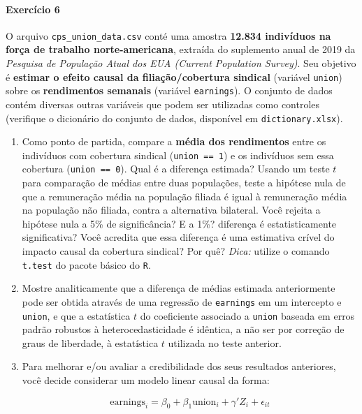 \documentclass[10pt,a4paper]{article}
\begin{document}
 \paragraph{Exercício 6} O arquivo \texttt{cps\_union\_data.csv} conté uma amostra \textbf{12.834 indivíduos na força de trabalho norte-americana}, extraída do suplemento anual de 2019 da \textit{Pesquisa de População Atual dos EUA (Current Population Survey)}. Seu objetivo é \textbf{estimar o efeito causal da filiação/cobertura sindical} (variável \texttt{union}) sobre os \textbf{rendimentos semanais} (variável \texttt{earnings}). O conjunto de dados contém diversas outras variáveis que podem ser utilizadas como controles (verifique o dicionário do conjunto de dados, disponível em \texttt{dictionary.xlsx}).
 
 \begin{enumerate}[label=\roman*]
 	
 	\item Como ponto de partida, compare a \textbf{média dos rendimentos} entre os indivíduos com cobertura sindical (\texttt{union == 1}) e os indivíduos sem essa cobertura (\texttt{union == 0}). Qual é a diferença estimada? Usando um teste $t$ para comparação de médias entre duas populações, teste a hipótese nula de que a remuneração média na população filiada é igual à remuneração média na população não filiada, contra a alternativa bilateral. Você rejeita a hipótese nula a 5\% de significância? E a 1\%?  diferença é estatisticamente significativa? Você acredita que essa diferença é uma estimativa crível do impacto causal da cobertura sindical? Por quê? \textit{Dica:} utilize o comando \texttt{t.test} do pacote básico do \texttt{R}.
 	
 	\item Mostre analiticamente que a diferença de médias estimada anteriormente pode ser obtida através de uma regressão de \texttt{earnings} em um intercepto e \texttt{union}, e que a estatística $t$ do coeficiente associado a \texttt{union} baseada em erros padrão robustos à heterocedasticidade é idêntica, a não ser por correção de graus de liberdade, à estatística $t$ utilizada no teste anterior. 
 	
 	\item Para melhorar e/ou avaliar a credibilidade dos seus resultados anteriores, você decide considerar um modelo linear causal da forma:
 	
 	\begin{equation}
 		\label{regression_model}
 		\text{earnings}_i = \beta_0 + \beta_1 \text{union}_i + \gamma'Z_i + \epsilon_{it}
 	\end{equation}
 	

\end{enumerate}
\end{document}
